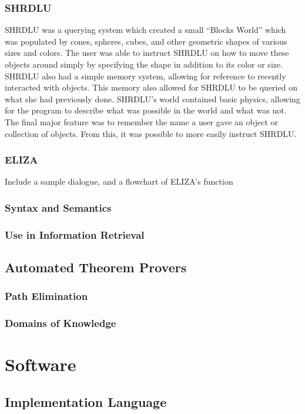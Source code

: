 \documentclass[12pt]{article}
\begin{document}
\subsubsection{SHRDLU}
SHRDLU was a querying system which created a small ``Blocks World'' which was populated by cones, spheres, cubes, and other geometric shapes of various sizes and colors. \cite{winograd} The user was able to instruct SHRDLU on how to move these objects around simply by specifying the shape in addition to its color or size. SHRDLU also had a simple memory system, allowing for reference to recently interacted with objects. This memory also allowed for SHRDLU to be queried on what she had previously done. SHRDLU's world contained basic physics, allowing for the program to describe what was possible in the world and what was not. The final major feature was to remember the name a user gave an object or collection of objects. From this, it was possible to more easily instruct SHRDLU.

\subsubsection{ELIZA}

\huge{Include a sample dialogue, and a flowchart of ELIZA's function}

\subsubsection{Syntax and Semantics}
\subsubsection{Use in Information Retrieval}
\subsection{Automated Theorem Provers}
\subsubsection{Path Elimination}
\subsubsection{Domains of Knowledge}

\section{Software}
\subsection{Implementation Language}
\end{document}
